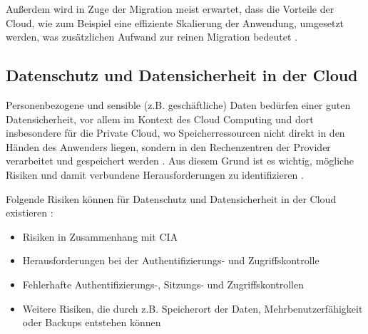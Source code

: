 Außerdem wird in Zuge der Migration meist erwartet, dass die Vorteile der Cloud, wie zum Beispiel eine effiziente Skalierung der Anwendung, umgesetzt werden, was zusätzlichen Aufwand zur reinen Migration bedeutet \cite[Vgl.][]{Ibryam2021}. \pagebreak

\subsection{Datenschutz und Datensicherheit in der Cloud}
Personenbezogene und sensible (z.B. geschäftliche) Daten bedürfen einer guten Datensicherheit, vor allem im Kontext des Cloud Computing und dort insbesondere für die Private Cloud, wo Speicherressourcen nicht direkt in den Händen des Anwenders liegen, sondern in den Rechenzentren der Provider verarbeitet und gespeichert werden \cite[Vgl.][S. 1ff]{Sun2019}. Aus diesem Grund ist es wichtig, mögliche Risiken und damit verbundene Herausforderungen zu identifizieren \cite[Vgl.][S. 3]{Sun2019}.

Folgende Risiken können für Datenschutz und Datensicherheit in der Cloud existieren \cite[Vgl. auch im folgenden][S. 694]{Kumar2018}:

\begin{itemize}
    \item Risiken in Zusammenhang mit \ac{CIA} 
    \item Herausforderungen bei der Authentifizierungs- und Zugriffskontrolle
    \item Fehlerhafte Authentifizierungs-, Sitzungs- und Zugriffskontrollen
    \item Weitere Risiken, die durch z.B. Speicherort der Daten, Mehrbenutzerfähigkeit oder Backups entstehen können
\end{itemize}

\pagebreak